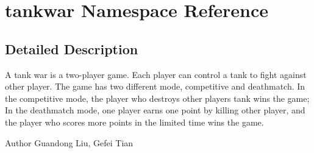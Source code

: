 \hypertarget{namespacetankwar}{}\section{tankwar Namespace Reference}
\label{namespacetankwar}


\subsection{Detailed Description}
A tank war is a two-\/player game. Each player can control a tank to fight against other player. The game has two different mode, competitive and deathmatch. In the competitive mode, the player who destroys other player\textquotesingle{}s tank wins the game; In the deathmatch mode, one player earns one point by killing other player, and the player who scores more points in the limited time wins the game.

\begin{DoxyAuthor}{Author}
Guandong Liu, Gefei Tian 
\end{DoxyAuthor}
